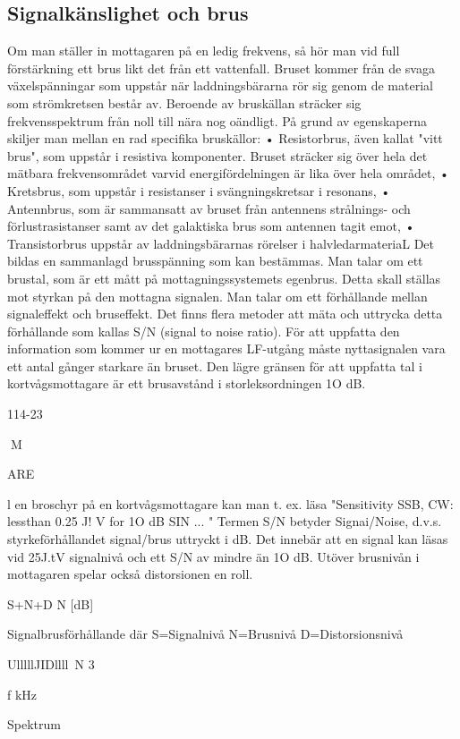 \subsection{Signalkänslighet och brus}

Om man ställer in mottagaren på en ledig
frekvens, så hör man vid full förstärkning ett
brus likt det från ett vattenfall.
Bruset kommer från de svaga växelspänningar som uppstår när laddningsbärarna
rör sig genom de material som strömkretsen
består av. Beroende av bruskällan sträcker
sig frekvensspektrum från noll till nära nog
oändligt. På grund av egenskaperna skiljer
man mellan en rad specifika bruskällor:
• Resistorbrus, även kallat "vitt brus", som
uppstår i resistiva komponenter. Bruset
sträcker sig över hela det mätbara frekvensområdet varvid energifördelningen
är lika över hela området,
• Kretsbrus, som uppstår i resistanser i
svängningskretsar i resonans,
• Antennbrus, som är sammansatt av
bruset från antennens strålnings- och
förlustrasistanser samt av det galaktiska
brus som antennen tagit emot,
• Transistorbrus uppstår av laddningsbärarnas rörelser i halvledarmateriaL
Det bildas en sammanlagd brusspänning
som kan bestämmas. Man talar om ett brustal, som är ett mått på mottagningssystemets
egenbrus. Detta skall ställas mot styrkan på
den mottagna signalen. Man talar om ett
förhållande mellan signaleffekt och bruseffekt. Det finns flera metoder att mäta och
uttrycka detta förhållande som kallas S/N
(signal to noise ratio). För att uppfatta den
information som kommer ur en mottagares
LF-utgång måste nyttasignalen vara ett antal gånger starkare än bruset. Den lägre
gränsen för att uppfatta tal i kortvågsmottagare är ett brusavstånd i storleksordningen 1O dB.

114-23

M

ARE

l en broschyr på en kortvågsmottagare
kan man t. ex. läsa "Sensitivity SSB, CW:
lessthan 0.25 J! V for 1O dB SIN ... "
Termen S/N betyder Signai/Noise, d.v.s.
styrkeförhållandet signal/brus uttryckt i dB.
Det innebär att en signal kan läsas vid 25J.tV
signalnivå och ett S/N av mindre än 1O dB.
Utöver brusnivån i mottagaren spelar också
distorsionen en roll.

S+N+D
N
[dB]

Signalbrusförhållande
där S=Signalnivå
N=Brusnivå
D=Distorsionsnivå

UlllllJIDllll~N
3

f kHz

Spektrum

